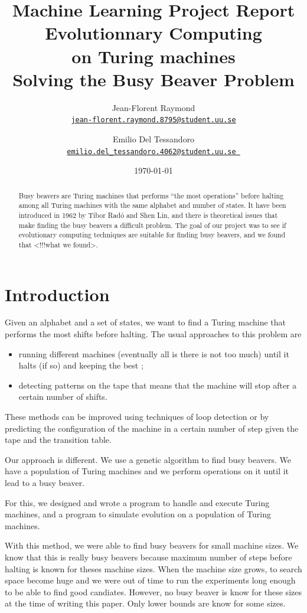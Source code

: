 \documentclass{report}
\title{Machine Learning Project Report\\\textbf{Evolutionnary Computing\\on Turing machines}\\{\Large Solving the Busy Beaver Problem}}
\author{Jean-Florent Raymond\\\href{mailto:jean-florent.raymond.8795@student.uu.se}{\texttt{jean-florent.raymond.8795@student.uu.se}} \and Emilio Del Tessandoro\\
  \href{mailto:emilio.del_tessandoro.4062@student.uu.se }{\texttt{emilio.del\_tessandoro.4062@student.uu.se }}}
\date{\today}
\begin{document}
\maketitle

\begin{abstract}

  Busy beavers are Turing machines that performs ``the most operations'' before halting among all Turing machines with the same alphabet and number of states. It have been introduced in 1962 by Tibor Radó and Shen Lin, and there is theoretical issues that make finding the busy beavers a difficult problem.
The goal of our project was to see if evolutionary computing techniques are suitable for finding busy beavers, and we found that <!!!what we found>.

\end{abstract}

\chapter{Introduction}
\label{chap:intro}

Given an alphabet and a set of states, we want to find a Turing machine that performs the most shifts before halting. The usual approaches \cite{rado} to this problem are
\begin{itemize}
\item running different machines (eventually all is there is not too much) until it halts (if so) and keeping the best ;
\item detecting patterns on the tape that means that the machine will stop after a certain number of shifts.
\end{itemize}
These methods can be improved using techniques of loop detection or by predicting the configuration of the machine in a certain number of step given the tape and the transition table.

Our approach is different. We use a genetic algorithm to find busy beavers. We have a population of Turing machines and we perform operations on it until it lead to a busy beaver.

For this, we designed and wrote a program to handle and execute Turing machines, and a program to simulate evolution on a population of Turing machines.

With this method, we were able to find busy beavers for small machine sizes. We know that this is really busy beavers because maximum number of steps before halting is known for theses machine sizes. When the machine size grows, to search space become huge and we were out of time to run the experiments long enough to be able to find good candiates. However, no busy beaver is know for these sizes at the time of writing this paper. Only lower bounds are know for some sizes.
\end{document}
